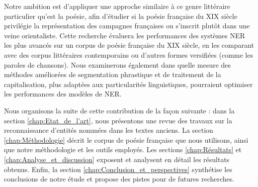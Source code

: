 Notre ambition est d'appliquer une approche similaire à ce genre littéraire particulier qu'est la poésie, afin d'étudier si la poésie française du XIX siècle privilégie la représentation des campagnes françaises ou s'inscrit plutôt dans une veine orientaliste. Cette recherche évaluera les performances des systèmes NER les plus avancés sur un corpus de poésie française du XIX siècle, en les comparant avec des corpus littéraires contemporains ou d'autres formes versifiées (comme les paroles de chansons). Nous examinerons également dans quelle mesure des méthodes améliorées de segmentation phrastique et de traitement de la capitalisation, plus adaptées aux particularités linguistiques, pourraient optimiser les performances des modèles de NER.

Nous organisons la suite de cette contribution de la façon suivante : dans la section \ref{chap:Etat_de_l'art}, nous présentons une revue des travaux sur la reconnaissance d'entités nommées dans les textes anciens. La section \ref{chap:Méthodologie} décrit le corpus de poésie française que nous utilisons, ainsi que notre méthodologie et les outils employés. Les sections \ref{chap:Résultats} et \ref{chap:Analyse_et_discussion} exposent et analysent en détail les résultats obtenus. Enfin, la section \ref{chap:Conclusion_et_perspectives} synthétise les conclusions de notre étude et propose des pistes pour de futures recherches.

